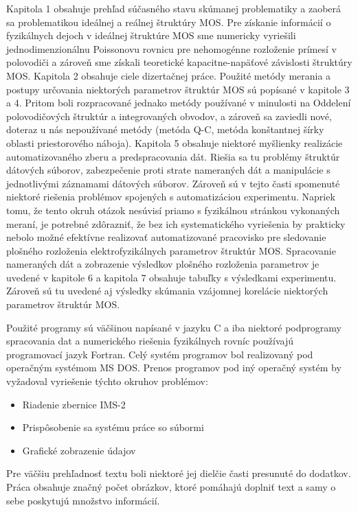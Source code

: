 \par Kapitola 1 obsahuje prehľad súčasného stavu skúmanej problematiky
a zaoberá sa problematikou ideálnej a reálnej štruktúry MOS\@. Pre
získanie informácií o fyzikálnych dejoch v ideálnej štruktúre MOS sme
numericky vyriešili jednodimenzionálnu Poissonovu rovnicu pre
nehomogénne rozloženie prímesí v polovodiči a zároveň sme získali
teoretické kapacitne-napäťové závislosti štruktúry MOS\@. Kapitola 2
obsahuje ciele dizertačnej práce. Použité metódy merania a postupy
určovania niektorých parametrov štruktúr MOS sú popísané v kapitole 3
a 4. Pritom boli rozpracované jednako metódy používané v minulosti na
Oddelení polovodičových štruktúr a integrovaných obvodov, a zároveň sa
zaviedli nové, doteraz u nás nepoužívané metódy (metóda Q-C, metóda
konštantnej šírky oblasti priestorového náboja). Kapitola 5 obsahuje
niektoré myšlienky realizácie automatizovaného zberu a predspracovania
dát. Riešia sa tu problémy štruktúr dátových súborov, zabezpečenie
proti strate nameraných dát a manipulácie s jednotlivými záznamami
dátových súborov. Zároveň sú v tejto časti spomenuté niektoré riešenia
problémov spojených s automatizáciou experimentu. Napriek tomu, že
tento okruh otázok nesúvisí priamo s fyzikálnou stránkou vykonaných
meraní, je potrebné zdôrazniť, že bez ich systematického vyriešenia by
prakticky nebolo možné efektívne realizovať automatizované pracovisko
pre sledovanie plošného rozloženia elektrofyzikálnych parametrov
štruktúr MOS\@. Spracovanie nameraných dát a zobrazenie výsledkov
plošného rozloženia parametrov je uvedené v kapitole 6 a kapitola 7
obsahuje tabuľky s výsledkami experimentu. Zároveň sú tu uvedené aj
výsledky skúmania vzájomnej korelácie niektorých parametrov štruktúr
MOS\@.

\par Použité programy sú väčšinou napísané v jazyku C a iba niektoré
podprogramy spracovania dat a numerického riešenia fyzikálnych rovníc
používajú programovací jazyk Fortran. Celý systém programov bol
realizovaný pod operačným systémom MS DOS\@. Prenos programov pod iný
operačný systém by vyžadoval vyriešenie týchto okruhov problémov:

\begin{itemize}
\item Riadenie zbernice IMS-2
\item Prispôsobenie sa systému práce so súbormi
\item Grafické zobrazenie údajov
\end{itemize}

\par Pre väčšiu prehľadnosť textu boli niektoré jej dielčie časti
presunuté do dodatkov.  Práca obsahuje značný počet obrázkov, ktoré
pomáhajú doplniť text a samy o sebe poskytujú množstvo informácií.


